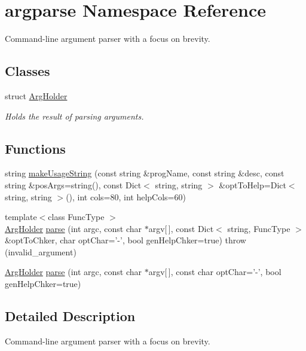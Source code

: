 \hypertarget{namespaceargparse}{\section{argparse Namespace Reference}
\label{namespaceargparse}
}


Command-\/line argument parser with a focus on brevity.  


\subsection*{Classes}
\begin{DoxyCompactItemize}
\item 
struct \hyperlink{structargparse_1_1_arg_holder}{Arg\-Holder}
\begin{DoxyCompactList}\small\item\em Holds the result of parsing arguments. \end{DoxyCompactList}\end{DoxyCompactItemize}
\subsection*{Functions}
\begin{DoxyCompactItemize}
\item 
string \hyperlink{namespaceargparse_a9178c3eba71719d6bed428a94e42010e}{make\-Usage\-String} (const string \&prog\-Name, const string \&desc, const string \&pos\-Args=string(), const Dict$<$ string, string $>$ \&opt\-To\-Help=Dict$<$ string, string $>$(), int cols=80, int help\-Cols=60)
\item 
{\footnotesize template$<$class Func\-Type $>$ }\\\hyperlink{structargparse_1_1_arg_holder}{Arg\-Holder} \hyperlink{namespaceargparse_a6a82e35cb0ec90fbe4a17db4ae3539d4}{parse} (int argc, const char $\ast$argv\mbox{[}$\,$\mbox{]}, const Dict$<$ string, Func\-Type $>$ \&opt\-To\-Chker, char opt\-Char='-\/', bool gen\-Help\-Chker=true)  throw (invalid\-\_\-argument)
\item 
\hyperlink{structargparse_1_1_arg_holder}{Arg\-Holder} \hyperlink{namespaceargparse_a6cfba06102a610840779069dfda1b98d}{parse} (int argc, const char $\ast$argv\mbox{[}$\,$\mbox{]}, const char opt\-Char='-\/', bool gen\-Help\-Chker=true)
\end{DoxyCompactItemize}


\subsection{Detailed Description}
Command-\/line argument parser with a focus on brevity. 

